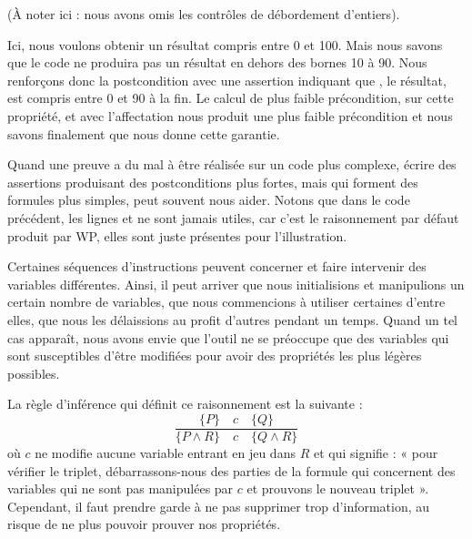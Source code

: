 (À noter ici : nous avons omis les contrôles de débordement d'entiers).



Ici, nous voulons obtenir un résultat compris entre 0 et 100. Mais nous savons
que le code ne produira pas un résultat en dehors des bornes 10 à 90. Nous
renforçons donc la postcondition avec une assertion indiquant que , le résultat,
est compris entre 0 et 90 à la fin. Le calcul de plus faible précondition, sur
cette propriété, et avec l'affectation  nous produit une
plus faible précondition  et nous savons finalement que
 nous donne cette garantie.



Quand une preuve a du mal à être réalisée sur un code plus complexe, écrire des
assertions produisant des postconditions plus fortes, mais qui forment des formules
plus simples, peut souvent nous aider. Notons que dans le code précédent, les lignes
 et  ne sont jamais utiles,
car c'est le raisonnement par défaut produit par WP, elles sont juste présentes
pour l'illustration.



\label{l3:statements-basic-constancy}


Certaines séquences d'instructions peuvent concerner et faire intervenir des
variables différentes. Ainsi, il peut arriver que nous initialisions et manipulions
un certain nombre de variables, que nous commencions à utiliser certaines d'entre
elles, que nous les délaissions au profit d'autres pendant un temps. Quand un
tel cas apparaît, nous avons envie que l'outil ne se préoccupe que des variables
qui sont susceptibles d'être modifiées pour avoir des propriétés les plus légères
possibles.



La règle d'inférence qui définit ce raisonnement est la suivante :
$$\dfrac{\{P\}\quad c\quad \{Q\}}{\{P \wedge R\}\quad c\quad \{Q \wedge R\}}$$
où $c$ ne modifie aucune variable entrant en jeu dans $R$ et qui signifie :
« pour vérifier le triplet, débarrassons-nous des parties de la formule qui
concernent des variables qui ne sont pas manipulées par $c$ et prouvons le
nouveau triplet ». Cependant, il faut prendre garde à ne pas supprimer trop
d'information, au risque de ne plus pouvoir prouver nos propriétés.



